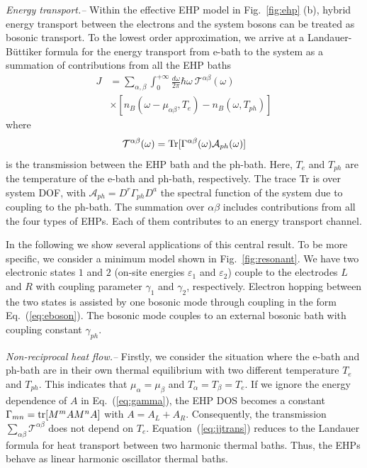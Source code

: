\documentclass[aps
,twocolumn
,floatfix,footinbib,prl
]{revtex4-1}
\begin{document}
\emph{ Energy transport.--}
Within the effective EHP model in Fig.~\ref{fig:ehp} (b), hybrid energy transport between the electrons and the system bosons can be treated as bosonic transport.
To the lowest order approximation, we arrive at a Landauer-B\"uttiker formula for the energy transport from e-bath to the system as a summation of contributions from all the EHP baths
\begin{align}
J &= \sum_{\alpha,\beta}\int_0^{+\infty}\frac{d\omega}{2\pi}\hbar\omega\ \mathcal{T}^{\alpha\beta}(\omega)\nonumber\\
&\times [n_B(\omega-\mu_{\alpha\beta},{T}_{e})-n_B(\omega,T_{ph})]
\label{eq:jjtrans}
\end{align}
where
\begin{align}
\mathcal{T}^{\alpha\beta}(\omega)={\rm Tr}[\Gamma^{\alpha\beta}(\omega)\mathcal{A}_{ph}(\omega)]
\end{align}
is the transmission between the EHP bath and the ph-bath. 
Here, $T_e$ and $T_{ph}$ are the temperature of the e-bath and ph-bath, respectively. The trace Tr is over system DOF, with $\mathcal{A}_{ph}=D^r \Gamma_{ph} D^a$ the spectral function of the system due to coupling to the ph-bath. The summation over $\alpha\beta$ includes contributions from all the four types of EHPs. Each of them contributes to an energy transport channel. 

In the following we show several applications of this central result.
To be more specific, we consider a minimum model shown in Fig.~\ref{fig:resonant}. We have two electronic states $1$ and $2$ (on-site energies $\varepsilon_1$ and $\varepsilon_2$) couple to the electrodes $L$ and $R$ with coupling parameter $\gamma_1$ and $\gamma_2$, respectively. 
Electron hopping between the two states is assisted by one bosonic mode through coupling in the form Eq.~(\ref{eq:eboson}). The bosonic mode couples to an external bosonic bath with coupling constant $\gamma_{ph}$.

\emph{Non-reciprocal heat flow.--}
Firstly, we consider the situation where the e-bath and ph-bath are in their own thermal equilibrium with two different temperature $T_e$ and $T_{ph}$. This indicates that  $\mu_{\alpha}=\mu_{\beta}$ and $T_{\alpha}=T_\beta=T_e$. 
If we ignore the energy dependence of $A$ in Eq.~(\ref{eq:gamma}),
the EHP DOS becomes a constant
$\Gamma_{mn}={\rm tr}[M^m A M^n A]$
with $A=A_L+A_R$. Consequently,  the transmission $\sum_{\alpha\beta}\mathcal{T}^{\alpha\beta}$ does not depend on $T_e$. Equation~(\ref{eq:jjtrans}) reduces to the Landauer formula for heat transport between two harmonic thermal baths. Thus, the EHPs behave as linear harmonic oscillator thermal baths. 
\end{document}
